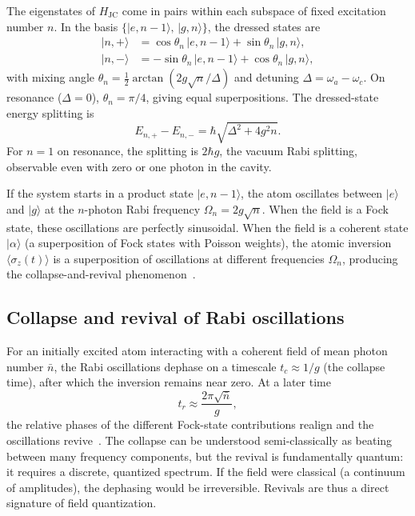 \documentclass[%
 reprint,
 amsmath,amssymb,
 aps,
]{revtex4-2}
\begin{document}
The eigenstates of $H_{\text{JC}}$ come in pairs within each subspace of fixed excitation number $n$. In the basis $\{|e, n{-}1\rangle,\, |g, n\rangle\}$, the dressed states are
\begin{align}
|n,+\rangle &= \cos\theta_n\, |e,n{-}1\rangle + \sin\theta_n\, |g,n\rangle, \label{eq:dressed_plus}\\
|n,-\rangle &= -\sin\theta_n\, |e,n{-}1\rangle + \cos\theta_n\, |g,n\rangle, \label{eq:dressed_minus}
\end{align}
with mixing angle $\theta_n = \tfrac{1}{2}\arctan(2g\sqrt{n}/\Delta)$ and detuning $\Delta = \omega_a - \omega_c$. On resonance ($\Delta = 0$), $\theta_n = \pi/4$, giving equal superpositions. The dressed-state energy splitting is
\begin{equation}
E_{n,+} - E_{n,-} = \hbar\sqrt{\Delta^2 + 4g^2 n}.
\label{eq:splitting}
\end{equation}
For $n = 1$ on resonance, the splitting is $2\hbar g$, the vacuum Rabi splitting, observable even with zero or one photon in the cavity.

If the system starts in a product state $|e, n{-}1\rangle$, the atom oscillates between $|e\rangle$ and $|g\rangle$ at the $n$-photon Rabi frequency $\Omega_n = 2g\sqrt{n}$. When the field is a Fock state, these oscillations are perfectly sinusoidal. When the field is a coherent state $|\alpha\rangle$ (a superposition of Fock states with Poisson weights), the atomic inversion $\langle\sigma_z(t)\rangle$ is a superposition of oscillations at different frequencies $\Omega_n$, producing the collapse-and-revival phenomenon~\cite{eberly1980}.


\subsection{Collapse and revival of Rabi oscillations}
\label{sec:collapse_revival}

For an initially excited atom interacting with a coherent field of mean photon number $\bar{n}$, the Rabi oscillations dephase on a timescale $t_c \approx 1/g$ (the collapse time), after which the inversion remains near zero. At a later time
\begin{equation}
t_r \approx \frac{2\pi\sqrt{\bar{n}}}{g},
\label{eq:trevival}
\end{equation}
the relative phases of the different Fock-state contributions realign and the oscillations revive~\cite{eberly1980}. The collapse can be understood semi-classically as beating between many frequency components, but the revival is fundamentally quantum: it requires a discrete, quantized spectrum. If the field were classical (a continuum of amplitudes), the dephasing would be irreversible. Revivals are thus a direct signature of field quantization.
\end{document}
